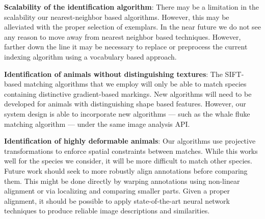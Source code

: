        \begin{itemln}


            \item \textbf{Scalability of the identification algorithm}:
            There may be a limitation in the scalability our nearest-neighbor based algorithms. However, this may
            be alleviated with the proper selection of exemplars. In the near future we do not see any reason to
            move away from nearest neighbor based techniques. However, farther down the line it may be necessary to
            replace or preprocess the current indexing algorithm using a vocabulary based approach.

            \item \textbf{Identification of animals without distinguishing textures}:
            The SIFT-based matching algorithms that we employ will only be able to match species containing
            distinctive gradient-based markings. New algorithms will need to be developed for animals with
            distinguishing shape based features. However, our system design is able to incorporate new algorithms
            --- such as the whale fluke matching algorithm --- under the same image analysis API{}.

            \item \textbf{Identification of highly deformable animals}:
            Our algorithms use projective transformations to enforce spatial constraints between matches. While
            this works well for the species we consider, it will be more difficult to match other species. Future
            work should seek to more robustly align annotations before comparing them. This might be done directly
            by warping annotations using non-linear alignment
            or via localizing and comparing smaller parts. Given a proper alignment, it should be possible to apply
            state-of-the-art neural network techniques to produce reliable image descriptions and similarities.


\end{itemln}
